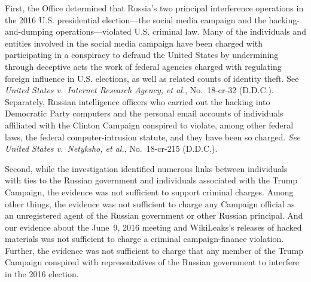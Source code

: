 First, the Office determined that Russia's two principal interference operations in the 2016 U.S. presidential election---the social media campaign and the hacking-and-dumping operations---violated U.S. criminal law.
Many of the individuals and entities involved in the social media campaign have been charged with participating in a conspiracy to defraud the United States by undermining through deceptive acts the work of federal agencies charged with regulating foreign influence in U.S. elections, as well as related counts of identity theft. See \textit{United States v.\ Internet Research Agency, et al.}, No.~18-cr-32 (D.D.C.).
Separately, Russian intelligence officers who carried out the hacking into Democratic Party computers and the personal email accounts of individuals affiliated with the Clinton Campaign conspired to violate, among other federal laws, the federal computer-intrusion statute, and they have been so charged.
\textit{See United States v.\ Netyksho, et al.}, No.~18-cr-215 (D.D.C.).


Second, while the investigation identified numerous links between individuals with ties to the Russian government and individuals associated with the Trump Campaign, the evidence was not sufficient to support criminal charges.
Among other things, the evidence was not sufficient to charge any Campaign official as an unregistered agent of the Russian government or other Russian principal.
And our evidence about the June~9, 2016 meeting and WikiLeaks's releases of hacked materials was not sufficient to charge a criminal campaign-finance violation.
Further, the evidence was not sufficient to charge that any member of the Trump Campaign conspired with representatives of the Russian government to interfere in the 2016 election.

